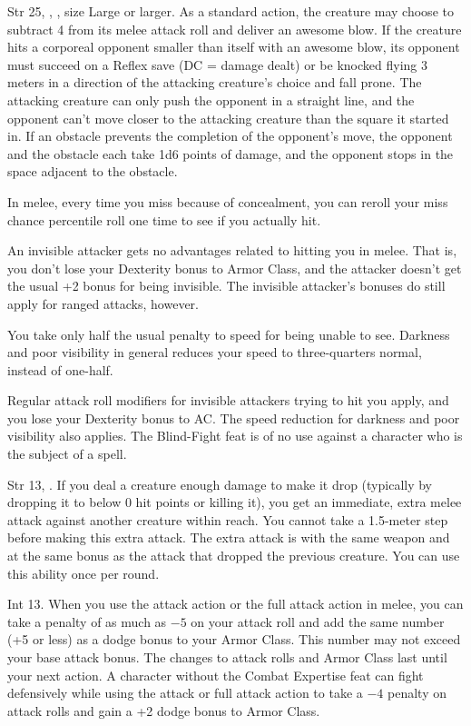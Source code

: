 
{Str 25, , , size Large or larger.}
{As a standard action, the creature may choose to subtract 4 from its melee attack roll and deliver an awesome blow. If the creature hits a corporeal opponent smaller than itself with an awesome blow, its opponent must succeed on a Reflex save (DC = damage dealt) or be knocked flying 3 meters in a direction of the attacking creature's choice and fall prone. The attacking creature can only push the opponent in a straight line, and the opponent can't move closer to the attacking creature than the square it started in. If an obstacle prevents the completion of the opponent's move, the opponent and the obstacle each take 1d6 points of damage, and the opponent stops in the space adjacent to the obstacle.}

{}
{In melee, every time you miss because of concealment, you can reroll your miss chance percentile roll one time to see if you actually hit.

An invisible attacker gets no advantages related to hitting you in melee. That is, you don't lose your Dexterity bonus to Armor Class, and the attacker doesn't get the usual +2 bonus for being invisible. The invisible attacker's bonuses do still apply for ranged attacks, however.

You take only half the usual penalty to speed for being unable to see. Darkness and poor visibility in general reduces your speed to three-quarters normal, instead of one-half.}
{Regular attack roll modifiers for invisible attackers trying to hit you apply, and you lose your Dexterity bonus to AC. The speed reduction for darkness and poor visibility also applies.}
{The Blind-Fight feat is of no use against a character who is the subject of a  spell.}{}

{Str 13, .}
{If you deal a creature enough damage to make it drop (typically by dropping it to below 0 hit points or killing it), you get an immediate, extra melee attack against another creature within reach. You cannot take a 1.5-meter step before making this extra attack. The extra attack is with the same weapon and at the same bonus as the attack that dropped the previous creature. You can use this ability once per round.}

{}
{Int 13.}
{When you use the attack action or the full attack action in melee, you can take a penalty of as much as $-5$ on your attack roll and add the same number (+5 or less) as a dodge bonus to your Armor Class. This number may not exceed your base attack bonus. The changes to attack rolls and Armor Class last until your next action.}
{A character without the Combat Expertise feat can fight defensively while using the attack or full attack action to take a $-4$ penalty on attack rolls and gain a +2 dodge bonus to Armor Class.}{}

